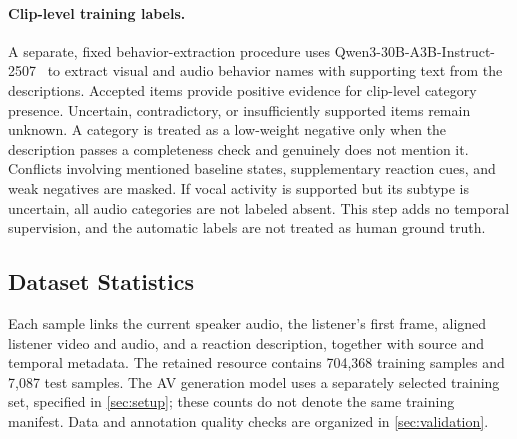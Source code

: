 \paragraph{Clip-level training labels.}
A separate, fixed behavior-extraction procedure uses Qwen3-30B-A3B-Instruct-2507~\cite{qwen3} to extract visual and audio behavior names with supporting text from the descriptions. Accepted items provide positive evidence for clip-level category presence. Uncertain, contradictory, or insufficiently supported items remain unknown. A category is treated as a low-weight negative only when the description passes a completeness check and genuinely does not mention it. Conflicts involving mentioned baseline states, supplementary reaction cues, and weak negatives are masked. If vocal activity is supported but its subtype is uncertain, all audio categories are not labeled absent. This step adds no temporal supervision, and the automatic labels are not treated as human ground truth.

\subsection{Dataset Statistics}
\label{sec:data-statistics}
Each sample links the current speaker audio, the listener's first frame, aligned listener video and audio, and a reaction description, together with source and temporal metadata. The retained resource contains 704,368 training samples and 7,087 test samples. The AV generation model uses a separately selected training set, specified in \cref{sec:setup}; these counts do not denote the same training manifest. Data and annotation quality checks are organized in \cref{sec:validation}.

